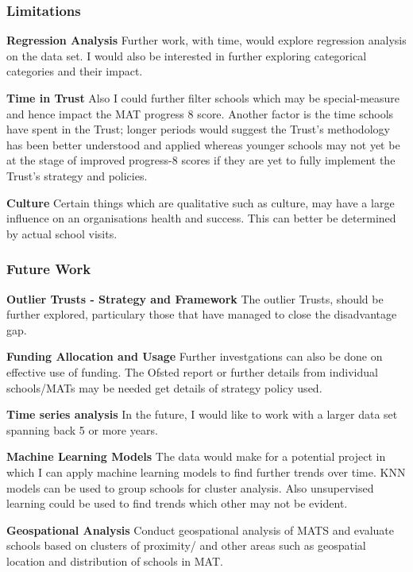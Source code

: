 \documentclass[
  letterpaper,
  DIV=11,
  numbers=noendperiod]{scrartcl}
\begin{document}
\subsubsection{Limitations}\label{limitations}

\textbf{Regression Analysis} Further work, with time, would explore
regression analysis on the data set. I would also be interested in
further exploring categorical categories and their impact.

\textbf{Time in Trust} Also I could further filter schools which may be
special-measure and hence impact the MAT progress 8 score. Another
factor is the time schools have spent in the Trust; longer periods would
suggest the Trust's methodology has been better understood and applied
whereas younger schools may not yet be at the stage of improved
progress-8 scores if they are yet to fully implement the Trust's
strategy and policies.

\textbf{Culture} Certain things which are qualitative such as culture,
may have a large influence on an organisations health and success. This
can better be determined by actual school visits.

\subsubsection{Future Work}\label{future-work}

\textbf{Outlier Trusts - Strategy and Framework} The outlier Trusts,
should be further explored, particulary those that have managed to close
the disadvantage gap.

\textbf{Funding Allocation and Usage} Further investgations can also be
done on effective use of funding. The Ofsted report or further details
from individual schools/MATs may be needed get details of strategy
policy used.

\textbf{Time series analysis} In the future, I would like to work with a
larger data set spanning back 5 or more years.

\textbf{Machine Learning Models} The data would make for a potential
project in which I can apply machine learning models to find further
trends over time. KNN models can be used to group schools for cluster
analysis. Also unsupervised learning could be used to find trends which
other may not be evident.

\textbf{Geospational Analysis} Conduct geospational analysis of MATS and
evaluate schools based on clusters of proximity/ and other areas such as
geospatial location and distribution of schools in MAT.
\end{document}
